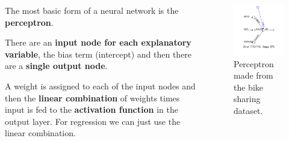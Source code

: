 \documentclass[aspectratio=169,10pt]{beamer}
\begin{document}
\begin{frame}{\secname}{\subsecname}
  \begin{columns}
    \begin{column}{.5\textwidth}
      The most basic form of a neural network is the \textbf{perceptron}.
      \newline

      There are an \textbf{input node for each explanatory variable}, the bias term (intercept) and then there are a \textbf{single output node}.
      \newline

      A weight is assigned to each of the input nodes and then the \textbf{linear combination} of weights times input is fed to the \textbf{activation function} in the output layer.
      For regression we can just use the linear combination.
      \newline
    \end{column}
    \begin{column}{.5\textwidth}
      \begin{figure}
        \includegraphics[width=.7\textwidth]{scripts/output/perceptron.pdf}
        \caption{Perceptron made from the bike sharing dataset.}
      \end{figure}
    \end{column}
  \end{columns}
\end{frame}
\end{document}
